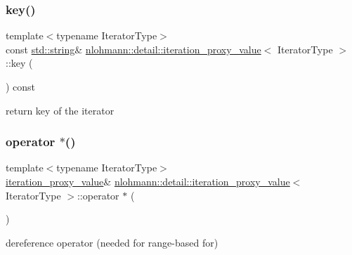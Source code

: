 \subsubsection{\texorpdfstring{key()}{key()}}
{\footnotesize\ttfamily template$<$typename Iterator\+Type$>$ \\
const \mbox{\hyperlink{namespacenlohmann_1_1detail_a1ed8fc6239da25abcaf681d30ace4985ab45cffe084dd3d20d928bee85e7b0f21}{std\+::string}}\& \mbox{\hyperlink{classnlohmann_1_1detail_1_1iteration__proxy__value}{nlohmann\+::detail\+::iteration\+\_\+proxy\+\_\+value}}$<$ Iterator\+Type $>$\+::key (\begin{DoxyParamCaption}{ }\end{DoxyParamCaption}) const\hspace{0.3cm}{\ttfamily [inline]}}



return key of the iterator 

\mbox{\label{classnlohmann_1_1detail_1_1iteration__proxy__value_a41384b6e643e8388e4c849b6b8f1312a}} 
\subsubsection{\texorpdfstring{operator $\ast$()}{operator *()}}
{\footnotesize\ttfamily template$<$typename Iterator\+Type$>$ \\
\mbox{\hyperlink{classnlohmann_1_1detail_1_1iteration__proxy__value}{iteration\+\_\+proxy\+\_\+value}}\& \mbox{\hyperlink{classnlohmann_1_1detail_1_1iteration__proxy__value}{nlohmann\+::detail\+::iteration\+\_\+proxy\+\_\+value}}$<$ Iterator\+Type $>$\+::operator $\ast$ (\begin{DoxyParamCaption}{ }\end{DoxyParamCaption})\hspace{0.3cm}{\ttfamily [inline]}}



dereference operator (needed for range-\/based for) 

\mbox{\label{classnlohmann_1_1detail_1_1iteration__proxy__value_a646dbb2b1842f44f42ee1e14245b8595}} 
